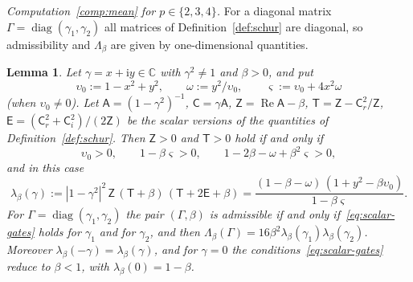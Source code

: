\documentclass[11pt,reqno]{amsart}
\newtheorem{lemma}[theorem]{Lemma}
\theoremstyle{definition}
\numberwithin{equation}{section}
\newcommand{\C}{\mathbb{C}}
\newcommand{\ii}{\mathrm{i}}
\newcommand{\sA}{\mathsf{A}}
\newcommand{\sC}{\mathsf{C}}
\newcommand{\sZ}{\mathsf{Z}}
\newcommand{\sT}{\mathsf{T}}
\newcommand{\sE}{\mathsf{E}}
\DeclareMathOperator{\RePart}{Re}
\DeclareMathOperator{\diag}{diag}
\begin{document}
\emph{Computation~\ref{comp:mean} for $p\in\{2,3,4\}$.} For a diagonal matrix $\Gamma=\diag(\gamma_1,\gamma_2)$ all matrices of Definition~\ref{def:schur} are diagonal, so admissibility and $\Lambda_\beta$ are given by one-dimensional quantities.

\begin{lemma}\label{lem:lambda-scalar}
Let $\gamma=x+\ii y\in\C$ with $\gamma^2\ne1$ and $\beta>0$, and put
\[
  \upsilon_0:=1-x^2+y^2,\qquad\omega:=y^2/\upsilon_0,\qquad\varsigma:=\upsilon_0+4x^2\omega
\]
(when $\upsilon_0\ne0$). Let $\sA=(1-\gamma^2)^{-1}$, $\sC=\gamma\sA$, $\sZ=\RePart\sA-\beta$, $\sT=\sZ-\sC_r^2/\sZ$, $\sE=(\sC_r^2+\sC_i^2)/(2\sZ)$ be the scalar versions of the quantities of Definition~\ref{def:schur}. Then $\sZ>0$ and $\sT>0$ hold if and only if
\begin{equation}\label{eq:scalar-gates}
  \upsilon_0>0,\qquad1-\beta\varsigma>0,\qquad1-2\beta-\omega+\beta^2\varsigma>0 ,
\end{equation}
and in this case
\[
  \lambda_\beta(\gamma):=|1-\gamma^2|^2\,\sZ\,(\sT+\beta)\,(\sT+2\sE+\beta)=\frac{(1-\beta-\omega)\,(1+y^2-\beta\upsilon_0)}{1-\beta\varsigma}.
\]
For $\Gamma=\diag(\gamma_1,\gamma_2)$ the pair $(\Gamma,\beta)$ is admissible if and only if~\eqref{eq:scalar-gates} holds for $\gamma_1$ and for $\gamma_2$, and then $\Lambda_\beta(\Gamma)=16\beta^2\lambda_\beta(\gamma_1)\lambda_\beta(\gamma_2)$. Moreover $\lambda_\beta(-\gamma)=\lambda_\beta(\gamma)$, and for $\gamma=0$ the conditions~\eqref{eq:scalar-gates} reduce to $\beta<1$, with $\lambda_\beta(0)=1-\beta$.
\end{lemma}
\end{document}
